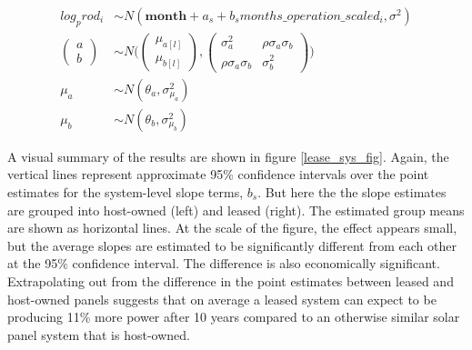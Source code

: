 \documentclass[a4paper]{article}
\begin{document}
\begin{equation}
\begin{aligned}
log_prod_{i} &\sim N(\mathbf{month} + a_s + b_s months\_operation\_scaled_{i}, \sigma^2)\\
\begin{pmatrix}
  a\\
  b
\end{pmatrix}
&\sim N \Bigg(
\begin{pmatrix}
  \mu_{a[l]}\\
  \mu_{b[l]}
\end{pmatrix},
\begin{pmatrix}
  \sigma_{a}^2 & \rho \sigma_{a} \sigma_{b} \\
  \rho \sigma_a \sigma_b & \sigma_b^2
\end{pmatrix} \Bigg) \\
\mu_{a} &\sim N(\theta_a, \sigma_{\mu_a}^2) \\
\mu_{b} & \sim N(\theta_b, \sigma_{\mu_b}^2) \label{eqn:fullmodel}
\end{aligned}
\end{equation}

A visual summary of the results are shown in figure \ref{lease_sys_fig}. Again, the vertical lines represent approximate 95\% confidence intervals over the point estimates for the system-level slope terms, $b_s$. But here the the slope estimates are grouped into host-owned (left) and leased (right). The estimated group means are shown as horizontal lines. At the scale of the figure, the effect appears small, but the average slopes are estimated to be significantly different from each other at the 95\% confidence interval. The difference is also economically significant. Extrapolating out from the difference in the point estimates between leased and host-owned panels suggests that on average a leased system can expect to be producing 11\% more power after 10 years compared to an otherwise similar solar panel system that is host-owned.
\end{document}
